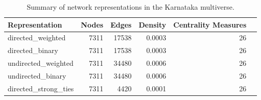 \begin{table}
\caption{Summary of network representations in the Karnataka multiverse.}
\label{tab:universe_summary}
\begin{tabular}{lrrrrr}
\toprule
Representation & Nodes & Edges & Density & Centrality Measures \\
\midrule
directed\_weighted & 7311 & 17538 & 0.0003 & 26 \\
directed\_binary & 7311 & 17538 & 0.0003 & 26 \\
undirected\_weighted & 7311 & 34480 & 0.0006 & 26 \\
undirected\_binary & 7311 & 34480 & 0.0006 & 26 \\
directed\_strong\_ties & 7311 & 4420 & 0.0001 & 26 \\
\bottomrule
\end{tabular}
\end{table}

